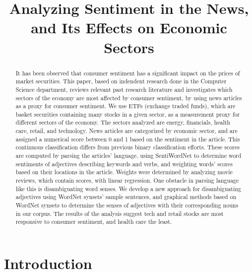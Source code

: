 \documentclass[pageno]{jpaper}
\begin{document}
\title{
Analyzing Sentiment in the News, and Its Effects on Economic Sectors}

\date{}
\maketitle
\doublespacing
\pagestyle{plain}
\setcounter{page}{1}

\begin{abstract}
It has been observed that consumer sentiment has a significant impact on the prices of market securities. This paper, based on indendent research done in the Computer Science department, reviews relevant past research literature and investigates which sectors of the economy are most affected by consumer sentiment, by using news articles as a proxy for consumer sentiment. We use ETFs (exchange traded funds), which are basket securities containing many stocks in a given sector, as a measurement proxy for different sectors of the economy. The sectors analyzed are energy, financials, health care, retail, and technology. News articles are categorized by economic sector, and are assigned a numerical score between 0 and 1 based on the sentiment in the article. This continuous classification differs from previous binary classification efforts. These scores are computed by parsing the articles' language, using SentiWordNet to determine word sentiments of adjectives describing keywords and verbs, and weighting words' scores based on their locations in the article. Weights were determined by analyzing movie reviews, which contain scores, with linear regression. One obstacle in parsing language like this is disambiguating word senses. We develop a new approach for disambiguating adjectives using WordNet synsets' sample sentences, and graphical methods based on WordNet synsets to determine the senses of adjectives with their corresponding nouns in our corpus. The results of the analysis suggest tech and retail stocks are most responsive to consumer sentiment, and health care the least.
\end{abstract}

\section{Introduction}
\end{document}
